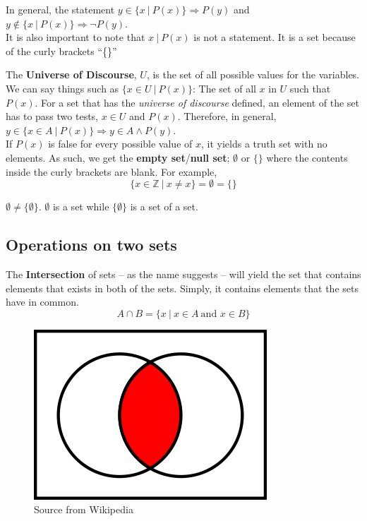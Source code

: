 \documentclass[../setup.tex]{subfiles}
\begin{document}
\begin{remark}
In general, the statement $y \in \{x\ |\ P(x)\} \Rightarrow P(y)$ and $y \notin \{x\ |\ P(x)\} \Rightarrow \lnot P(y)$. \\
It is also important to note that ${x\ |\ P(x)}$ is not a statement. It is a set because of the curly brackets ``\{\}''
\end{remark}

\begin{theorem}
The \textbf{Universe of Discourse}, $U$, is the set of all possible values for the variables. We can say things such as $\{x \in U\ |\ P(x)\}$: The set of all $x$ in $U$ such that $P(x)$. For a set that has the \textit{universe of discourse} defined, an element of the set has to pass two tests, $x \in U$ and $P(x)$. Therefore, in general, $y \in \{x\in A\ |\ P(x)\} \Rightarrow y\in A \land P(y)$. \\
If $P(x)$ is false for every possible value of $x$, it yields a truth set with no elements. As such, we get the \textbf{empty set}/\textbf{null set}; $\emptyset$ or $\{\}$ where the contents inside the curly brackets are blank. For example, \\
\[\{x\in\mathbb{Z} \ |\ x \neq x\} = \emptyset = \{\}\]
\end{theorem}

\begin{remark}
$\emptyset \neq \{\emptyset\}$. $\emptyset$ is a set while $\{\emptyset\}$ is a set of a set.
\end{remark}



\subsection{Operations on two sets}
\begin{theorem}
The \textbf{Intersection} of sets -- as the name suggests -- will yield the set that contains elements that exists in both of the sets. Simply, it contains elements that the sets have in common.
\[A\cap B = \{x\ |\ x\in A\ \text{and } x\in B \}\]
\begin{figure}[H]
    \centering
    \includegraphics[scale=0.6]{Venn Diagram-Intersection.png}
    \caption{Source from Wikipedia}
\end{figure}
\end{theorem}
\end{document}
